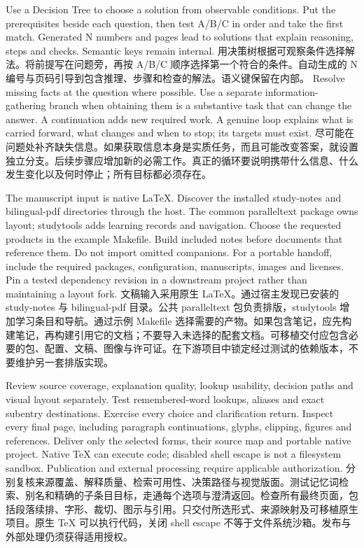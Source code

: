  {Use a Decision Tree to choose a solution from observable conditions. Put the prerequisites beside each question, then test A/B/C in order and take the first match. Generated N numbers and pages lead to solutions that explain reasoning, steps and checks. Semantic keys remain internal.}
 {用决策树根据可观察条件选择解法。将前提写在问题旁，再按 A/B/C 顺序选择第一个符合的条件。自动生成的 N 编号与页码引导到包含推理、步骤和检查的解法。语义键保留在内部。}
 {Resolve missing facts at the question where possible. Use a separate information-gathering branch when obtaining them is a substantive task that can change the answer. A continuation adds new required work. A genuine loop explains what is carried forward, what changes and when to stop; its targets must exist.}
 {尽可能在问题处补齐缺失信息。如果获取信息本身是实质任务，而且可能改变答案，就设置独立分支。后续步骤应增加新的必需工作。真正的循环要说明携带什么信息、什么发生变化以及何时停止；所有目标都必须存在。}

 {The manuscript input is native LaTeX. Discover the installed study-notes and bilingual-pdf directories through the host. The common paralleltext package owns layout; studytools adds learning records and navigation. Choose the requested products in the example Makefile. Build included notes before documents that reference them. Do not import omitted companions. For a portable handoff, include the required packages, configuration, manuscripts, images and licenses. Pin a tested dependency revision in a downstream project rather than maintaining a layout fork.}
 {文稿输入采用原生 LaTeX。通过宿主发现已安装的 study-notes 与 bilingual-pdf 目录。公共 paralleltext 包负责排版，studytools 增加学习条目和导航。通过示例 Makefile 选择需要的产物。如果包含笔记，应先构建笔记，再构建引用它的文档；不要导入未选择的配套文档。可移植交付应包含必要的包、配置、文稿、图像与许可证。在下游项目中锁定经过测试的依赖版本，不要维护另一套排版实现。}

 {Review source coverage, explanation quality, lookup usability, decision paths and visual layout separately. Test remembered-word lookups, aliases and exact subentry destinations. Exercise every choice and clarification return. Inspect every final page, including paragraph continuations, glyphs, clipping, figures and references. Deliver only the selected forms, their source map and portable native project. Native TeX can execute code; disabled shell escape is not a filesystem sandbox. Publication and external processing require applicable authorization.}
 {分别复核来源覆盖、解释质量、检索可用性、决策路径与视觉版面。测试记忆词检索、别名和精确的子条目目标，走通每个选项与澄清返回。检查所有最终页面，包括段落续排、字形、裁切、图示与引用。只交付所选形式、来源映射及可移植原生项目。原生 TeX 可以执行代码，关闭 shell escape 不等于文件系统沙箱。发布与外部处理仍须获得适用授权。}
